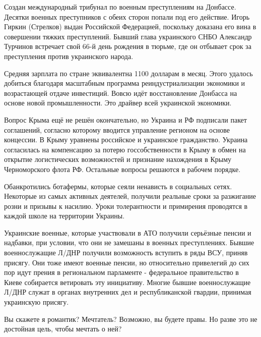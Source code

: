 Создан международный трибунал по военным преступлениям на Донбассе. Десятки
военных преступников с обеих сторон попали под его действие. Игорь Гиркин
(Стрелков) выдан Российской Федерацией, поскольку доказана его вина в
совершении тяжких преступлений. Бывший глава украинского СНБО Александр
Турчинов встречает свой 66-й день рождения в тюрьме, где он отбывает срок за
преступления против украинского народа.

Средняя зарплата по стране эквивалентна 1100 долларам в месяц. Этого удалось
добиться благодаря масштабным программа реиндустриализации экономики и
возрастающей отдаче инвестиций. Вовсю идёт восстановление Донбасса на основе
новой промышленности. Это драйвер всей украинской экономики.

Вопрос Крыма ещё не решён окончательно, но Украина и РФ подписали пакет
соглашений, согласно которому вводится управление регионом на основе концессии.
В Крыму уравнены российское и украинское гражданство. Украина согласилась на
компенсацию за потерю госсобственности в Крыму в обмен на открытие
логистических возможностей и признание нахождения в Крыму Черноморского флота
РФ. Остальные вопросы решаются в рабочем порядке.

Обанкротились ботафермы, которые сеяли ненависть в социальных сетях. Некоторые
из самых активных деятелей, получили реальные сроки за разжигание розни и
призывы к насилию. Уроки толерантности и примирения проводятся в каждой школе
на территории Украины.

Украинские военные, которые участвовали в АТО получили серьёзные пенсии и
надбавки, при условии, что они не замешаны в военных преступлениях. Бывшие
военнослужащие Л/ДНР получили возможность вступить в ряды ВСУ, приняв присягу.
Они тоже имеют военные пенсии, но относительно привелегий до сих пор идут
прения в региональном парламенте  - федеральное правительство в Киеве
собирается ветировать эту инициативу. Многие бывшие военнослужащие Л/ДНР служат
в органах внутренних дел и республиканской гвардии, принимая украинскую
присягу.

Вы скажете я романтик? Мечтатель? Возможно, вы будете правы. Но разве это не
достойная цель, чтобы мечтать о ней?

